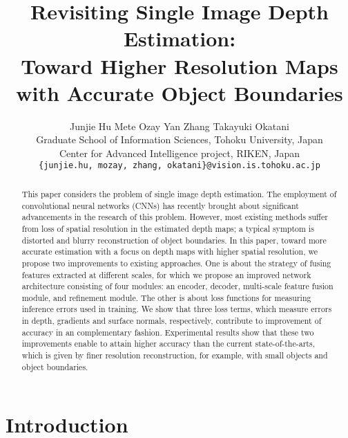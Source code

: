 \documentclass[10pt,twocolumn,letterpaper]{article}
\begin{document}
\title{Revisiting Single Image Depth Estimation: \\
Toward Higher Resolution Maps
with Accurate Object Boundaries}

\author{ Junjie Hu \hspace{1cm} Mete Ozay \hspace{1cm} Yan Zhang \hspace{1cm} Takayuki Okatani\\
 Graduate School of Information Sciences, Tohoku University, Japan \\
 Center for Advanced Intelligence project, RIKEN, Japan\\
{\tt\small \{junjie.hu, mozay, zhang, okatani\}@vision.is.tohoku.ac.jp}
}




\maketitle
\ifwacvfinal\thispagestyle{empty}\fi
\begin{abstract}
This paper considers the problem of single image depth estimation. 
The employment of convolutional neural networks (CNNs) has recently brought about significant advancements in the research of this problem. 
However, most existing methods suffer from loss of spatial resolution in the estimated depth maps; a typical symptom is distorted and blurry reconstruction of object boundaries.
In this paper, toward more accurate estimation with a focus on depth maps with higher spatial resolution, we propose two improvements to existing approaches.
One is about the strategy of fusing features extracted at different scales, for which we propose an improved network architecture consisting of four modules: an encoder, decoder, multi-scale feature fusion module, and refinement module.
The other is about loss functions for measuring inference errors used in training. We show that three loss terms, which measure errors in depth, gradients and surface normals, respectively, contribute to improvement of accuracy in an complementary fashion.
Experimental results show that these two improvements enable to attain higher accuracy than the current state-of-the-arts, which is given by finer resolution reconstruction, for example, with small objects and object boundaries. 
\end{abstract}

\section{Introduction}
\end{document}
